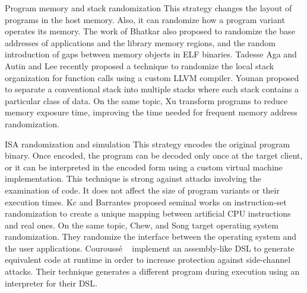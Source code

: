 \begin{strategy}{Program memory and stack randomization}
    \label{strategy:S4}
    \normalfont
    This strategy changes the layout of programs in the host memory. Also, it can randomize how a program variant operates its memory. The work of Bhatkar \etal \cite{bhatkar03, bhatkar2005efficient} also proposed to randomize the base addresses of applications and the library memory regions, and the random introduction of gaps between memory objects in ELF binaries. Tadesse Aga and Autin \cite{aga2019smokestack} and Lee \etal \cite{lee2021savior} recently proposed a technique to randomize the local stack organization for function calls using a custom LLVM compiler.
    Younan \etal \cite{Younan2006} proposed to separate a conventional stack into multiple stacks where each stack contains a particular class of
    data. 
    On the same topic, Xu \etal \cite{xu2020merr} transform programs to reduce memory exposure time, improving the time needed for frequent memory address randomization. 
\end{strategy}


\begin{strategy}{ISA randomization and simulation}
    \label{strategy:S5}
    \normalfont
    This strategy encodes the original program binary. Once encoded, the program can be decoded only once at the target client, or it can be interpreted in the encoded form using a custom virtual machine implementation. This technique is strong against attacks involving the examination of code. It does not affect the size of program variants or their execution times.
    Kc \etal and Barrantes \etal \cite{Kc03,barrantes2003randomized} proposed seminal works on instruction-set randomization 
    to create a unique mapping between artificial CPU instructions and real ones.
    On the same topic, Chew, and Song \cite{Chew02mitigatingbuffer} target operating system randomization. They randomize the interface between the operating system and the user applications.
    Courouss{\'e} \etal~\cite{courousse2016runtime} implement an assembly-like DSL to generate equivalent code at runtime in order to increase protection against side-channel attacks. Their technique generates a different program during execution using an interpreter for their DSL.

    
\end{strategy}


